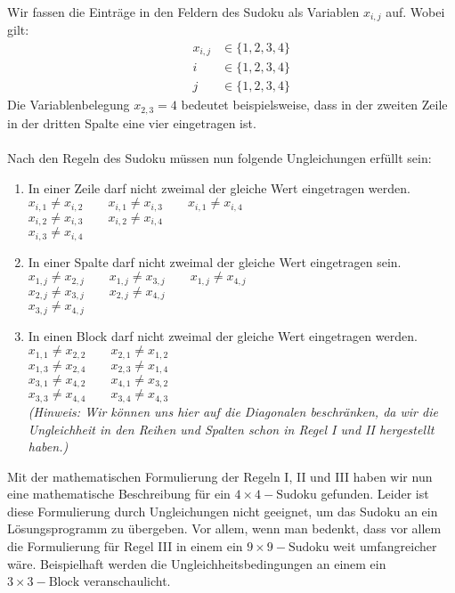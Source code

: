 \ \\
\ \\
\ \\
Wir fassen die Einträge in den Feldern des Sudoku als Variablen $x_{i,j}$ auf. Wobei gilt:
\vspace{-0.5cm}
\begin{align*}
&&x_{i,j} & \in \{1,2,3,4\} \\
&&i & \in \{1,2,3,4\} \\
&&j & \in \{1,2,3,4\}
\end{align*}
Die Variablenbelegung $x_{2,3}=4$ bedeutet beispielsweise, dass in der zweiten Zeile in der dritten Spalte eine vier eingetragen ist.\\
\ \\
Nach den Regeln des Sudoku müssen nun folgende Ungleichungen erfüllt sein:
\begin{enumerate}
\item In einer Zeile darf nicht zweimal der gleiche Wert eingetragen werden.\\
$x_{i,1} \neq x_{i,2} \qquad x_{i,1} \neq x_{i,3} \qquad x_{i,1} \neq x_{i,4}$\\
 $x_{i,2} \neq x_{i,3} \qquad x_{i,2} \neq x_{i,4}$\\
$x_{i,3} \neq x_{i,4}$
\item In einer Spalte darf nicht zweimal der gleiche Wert eingetragen sein.\\
$x_{1,j} \neq x_{2,j} \qquad x_{1,j} \neq x_{3,j} \qquad x_{1,j} \neq x_{4,j}$\\
 $x_{2,j} \neq x_{3,j} \qquad x_{2,j} \neq x_{4,j}$\\
$x_{3,j} \neq x_{4,j}$
\item In einen Block darf nicht zweimal der gleiche Wert eingetragen werden.\\
$x_{1,1} \neq x_{2,2} \qquad x_{2,1} \neq x_{1,2}$\\
$x_{1,3} \neq x_{2,4} \qquad x_{2,3} \neq x_{1,4}$\\
$x_{3,1} \neq x_{4,2} \qquad x_{4,1} \neq x_{3,2}$\\
$x_{3,3} \neq x_{4,4} \qquad x_{3,4} \neq x_{4,3}$\\
\emph{(Hinweis: Wir können uns hier auf die Diagonalen beschränken, da wir die Ungleichheit in den Reihen und Spalten schon in Regel I und II hergestellt haben.)}
\end{enumerate}
Mit der mathematischen Formulierung der Regeln I, II und III haben wir nun eine mathematische Beschreibung für ein $4\times 4 - \text{Sudoku}$ gefunden. Leider ist diese Formulierung durch Ungleichungen nicht geeignet, um das Sudoku an ein Lösungsprogramm zu übergeben. Vor allem, wenn man bedenkt, dass vor allem die Formulierung für Regel III in einem ein $9\times 9 - \text{Sudoku}$ weit umfangreicher wäre. Beispielhaft werden die Ungleichheitsbedingungen an einem ein $3\times 3 - \text{Block}$ veranschaulicht.\\
